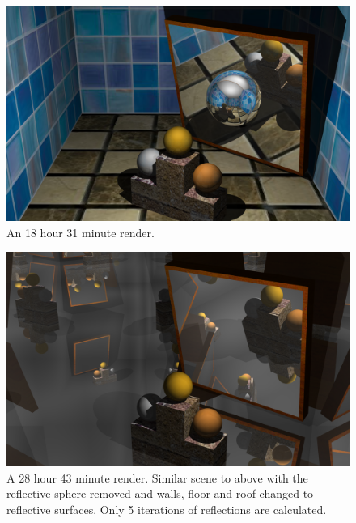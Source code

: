   \begin{figure}[p]
    \centering
    \includegraphics[height=0.9\textwidth,angle=90]{images/image1.png}
    \caption{An 18 hour 31 minute render.\label{good-render}}
  \end{figure}


  \begin{figure}[p]
    \centering
    \includegraphics[height=0.9\textwidth,angle=90]{images/image2.png}
    \caption{A 28 hour 43 minute render. Similar scene to above with
             the reflective sphere removed and walls, floor and roof changed to
             reflective surfaces.  Only 5 iterations of reflections are
             calculated.\label{good-render2}}
  \end{figure}
